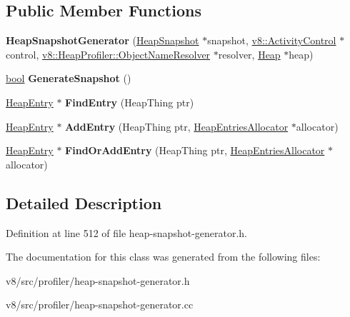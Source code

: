 \subsection*{Public Member Functions}
\begin{DoxyCompactItemize}
\item 
\mbox{\label{classv8_1_1internal_1_1HeapSnapshotGenerator_a45c0f122b9dccf1bc08cac2de7c2b0e2}} 
{\bfseries Heap\+Snapshot\+Generator} (\mbox{\hyperlink{classv8_1_1internal_1_1HeapSnapshot}{Heap\+Snapshot}} $\ast$snapshot, \mbox{\hyperlink{classv8_1_1ActivityControl}{v8\+::\+Activity\+Control}} $\ast$control, \mbox{\hyperlink{classv8_1_1HeapProfiler_1_1ObjectNameResolver}{v8\+::\+Heap\+Profiler\+::\+Object\+Name\+Resolver}} $\ast$resolver, \mbox{\hyperlink{classv8_1_1internal_1_1Heap}{Heap}} $\ast$heap)
\item 
\mbox{\label{classv8_1_1internal_1_1HeapSnapshotGenerator_a5119a215e57adbedee69fde36570a0dc}} 
\mbox{\hyperlink{classbool}{bool}} {\bfseries Generate\+Snapshot} ()
\item 
\mbox{\label{classv8_1_1internal_1_1HeapSnapshotGenerator_ae5f9e67931691295f034f9716127ae23}} 
\mbox{\hyperlink{classv8_1_1internal_1_1HeapEntry}{Heap\+Entry}} $\ast$ {\bfseries Find\+Entry} (Heap\+Thing ptr)
\item 
\mbox{\label{classv8_1_1internal_1_1HeapSnapshotGenerator_aeda4dd3dcd3b8b00965b567628587891}} 
\mbox{\hyperlink{classv8_1_1internal_1_1HeapEntry}{Heap\+Entry}} $\ast$ {\bfseries Add\+Entry} (Heap\+Thing ptr, \mbox{\hyperlink{classv8_1_1internal_1_1HeapEntriesAllocator}{Heap\+Entries\+Allocator}} $\ast$allocator)
\item 
\mbox{\label{classv8_1_1internal_1_1HeapSnapshotGenerator_ac742cae0bedd1ed9df541a3eac8be68c}} 
\mbox{\hyperlink{classv8_1_1internal_1_1HeapEntry}{Heap\+Entry}} $\ast$ {\bfseries Find\+Or\+Add\+Entry} (Heap\+Thing ptr, \mbox{\hyperlink{classv8_1_1internal_1_1HeapEntriesAllocator}{Heap\+Entries\+Allocator}} $\ast$allocator)
\end{DoxyCompactItemize}


\subsection{Detailed Description}


Definition at line 512 of file heap-\/snapshot-\/generator.\+h.



The documentation for this class was generated from the following files\+:\begin{DoxyCompactItemize}
\item 
v8/src/profiler/heap-\/snapshot-\/generator.\+h\item 
v8/src/profiler/heap-\/snapshot-\/generator.\+cc\end{DoxyCompactItemize}
